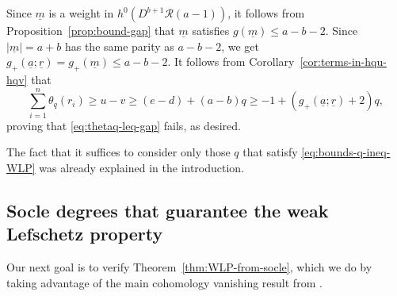 \documentclass[11pt,reqno]{amsart}
\newcommand{\mc}[1]{\mathcal{#1}}
\newcommand{\ul}[1]{\underline{#1}}
\theoremstyle{definition}
\theoremstyle{remark}
\numberwithin{equation}{section}
\begin{document}
 Since $\ul{m}$ is a weight in $h^0(D^{b+1}\mc{R}(a-1))$, it follows from Proposition~\ref{prop:bound-gap} that $\ul{m}$ satisfies $g(\ul{m})\leq a-b-2$. Since $|\ul{m}|=a+b$ has the same parity as $a-b-2$, we get $g_+(\ul{a};\ul{r})=g_+(\ul{m})\leq a-b-2$. It follows from Corollary~\ref{cor:terms-in-hqu-hqv} that 
 \[\sum_{i=1}^n\theta_q(r_i)\geq u-v \geq (e-d)+(a-b)q \geq -1+(g_+(\ul{a};\ul{r})+2)q,\]
 proving that \eqref{eq:thetaq-leq-gap} fails, as desired.

The fact that it suffices to consider only those $q$ that satisfy \eqref{eq:bounds-q-ineq-WLP} was already explained in the introduction.

\subsection{Socle degrees that guarantee the weak Lefschetz property}\label{subsec:WLP-from-socle} Our next goal is to verify Theorem~\ref{thm:WLP-from-socle}, which we do by taking advantage of the main cohomology vanishing result from \cite{gao-raicu}. 
\end{document}
